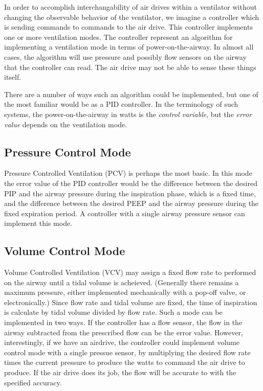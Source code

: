 \documentclass{article}
\begin{document}
In order to accomplish interchangability of air drives within a ventilator without
changing the observable behavior of the ventilator, we imagine a controller which
is sending commands to commands to the air drive.
This controller implements one or more ventilation modes.
The controller represent an algorithm for implementing a ventilation mode
in terms of power-on-the-airway. In almost all cases, the algorithm will use
pressure and possibly flow sensors on the airway that the controller can read.
The air drive may not be able to sense these things itself.

There are a number of ways such an algorithm could be implemented, but
one of the most familiar would be as a PID controller. In the terminology
of such systems, the power-on-the-airway in watts is the {\em control variable},
but the {\em error value} depends on the ventilation mode.

\subsection{Pressure Control Mode}

Pressure Controlled Ventilation (PCV) is perhaps the most basic.
In this mode the error value of the PID controller would be the difference
between the desired PIP and the airway pressure during the inspiration phase,
which is a fixed time, and the difference between the desired PEEP and the
airway pressure during the fixed expiration period. A controller with a single
airway pressure sensor can implement this mode.

\subsection{Volume Control Mode}

Volume Controlled Ventilation (VCV) may assign a fixed flow rate to
performed on the airway until a tidal volume is acheieved.
(Generally there remains
a maximum pressure, either implemented mechanically with a pop-off valve,
or electronically.)
Since
flow rate and tidal volume are fixed, the time of inspiration
is calculate by tidal volume divided by flow rate.
Such a mode can be implemented in two ways. If the controller
has a flow sensor, the flow in the airway subtracted from the
prescribed flow can be the error value. However, interestingly, if
we have an airdrive, the controller could implement volume control mode with a single
pressue sensor, by multiplying the desired flow rate times the current pressure
to produce the watts to command the air drive to produce. If the air drive does its
job, the flow will be accurate to with the specified accuracy.
\end{document}
